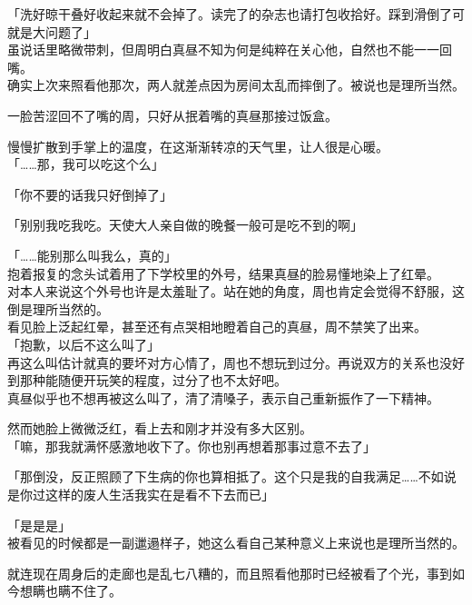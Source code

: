 「洗好晾干叠好收起来就不会掉了。读完了的杂志也请打包收拾好。踩到滑倒了可就是大问题了」\\

虽说话里略微带刺，但周明白真昼不知为何是纯粹在关心他，自然也不能一一回嘴。\\

确实上次来照看他那次，两人就差点因为房间太乱而摔倒了。被说也是理所当然。

一脸苦涩回不了嘴的周，只好从抿着嘴的真昼那接过饭盒。

慢慢扩散到手掌上的温度，在这渐渐转凉的天气里，让人很是心暖。\\

「……那，我可以吃这个么」

「你不要的话我只好倒掉了」

「别别我吃我吃。天使大人亲自做的晚餐一般可是吃不到的啊」

「……能别那么叫我么，真的」\\

抱着报复的念头试着用了下学校里的外号，结果真昼的脸易懂地染上了红晕。\\

对本人来说这个外号也许是太羞耻了。站在她的角度，周也肯定会觉得不舒服，这倒是理所当然的。\\

看见脸上泛起红晕，甚至还有点哭相地瞪着自己的真昼，周不禁笑了出来。\\

「抱歉，以后不这么叫了」\\

再这么叫估计就真的要坏对方心情了，周也不想玩到过分。再说双方的关系也没好到那种能随便开玩笑的程度，过分了也不太好吧。\\

真昼似乎也不想再被这么叫了，清了清嗓子，表示自己重新振作了一下精神。

然而她脸上微微泛红，看上去和刚才并没有多大区别。\\

「嘛，那我就满怀感激地收下了。你也别再想着那事过意不去了」

「那倒没，反正照顾了下生病的你也算相抵了。这个只是我的自我满足……不如说是你过这样的废人生活我实在是看不下去而已」

「是是是」\\

被看见的时候都是一副邋遢样子，她这么看自己某种意义上来说也是理所当然的。

就连现在周身后的走廊也是乱七八糟的，而且照看他那时已经被看了个光，事到如今想瞒也瞒不住了。\\

